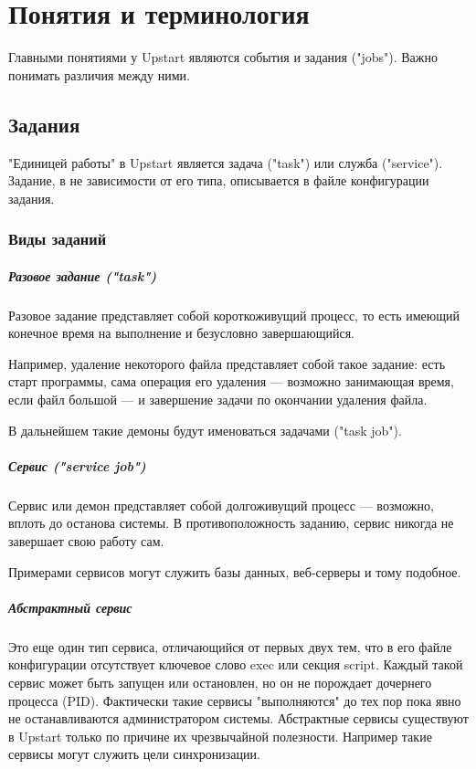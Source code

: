 \chapter{Понятия и терминология}
Главными понятиями у Upstart являются события и задания ("jobs"). Важно понимать различия между ними.
\section{Задания}
"Единицей работы" в Upstart является задача ("task") или служба ("service"). Задание, в не зависимости от его типа, описывается в файле конфигурации задания.
\subsection{Виды заданий}
\paragraph{Разовое задание ("task")}

Разовое задание представляет собой короткоживущий процесс, то есть имеющий конечное время на выполнение и безусловно завершающийся.

Например, удаление некоторого файла представляет собой такое задание: есть старт программы, сама операция его удаления --- возможно занимающая время, если файл большой --- и завершение задачи по окончании удаления файла.

В дальнейшем такие демоны будут именоваться задачами ("task job").

\paragraph{Сервис ("service job")}

Сервис или демон представляет собой долгоживущий процесс --- возможно, вплоть до останова системы. 
В противоположность заданию, сервис никогда не завершает свою работу сам.

Примерами сервисов могут служить базы данных, веб-серверы и тому подобное.
\paragraph{Абстрактный сервис}

Это еще один тип сервиса, отличающийся от первых двух тем, что в его файле конфигурации 
отсутствует ключевое слово exec или секция script. Каждый такой сервис может быть запущен или остановлен, но он не порождает дочернего процесса (PID). Фактически такие сервисы "выполняются" до тех пор пока явно не останавливаются администратором системы. Абстрактные сервисы существуют в Upstart  только по причине их чрезвычайной полезности. Например такие сервисы могут служить цели синхронизации.
